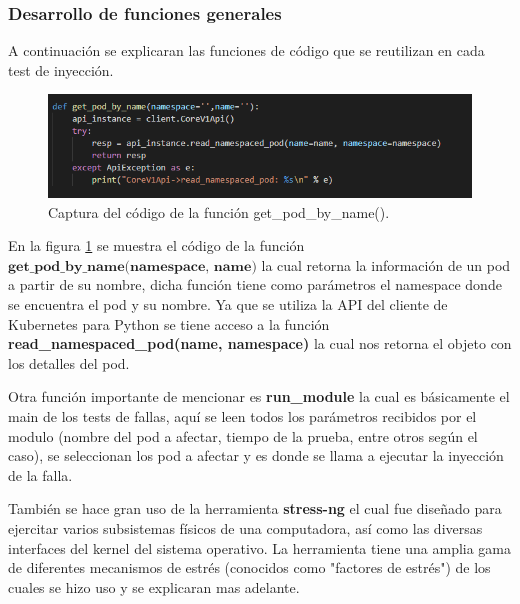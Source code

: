  

\subsubsection{Desarrollo de funciones generales}
\par A continuación se explicaran las funciones de código que se reutilizan en cada test de inyección.

\begin{figure}[htpb!]
	\centering
	\includegraphics[width=0.90\columnwidth]{images/captures/codigo/Capture_get_pod_by_name.PNG}
	\caption{Captura del código de la función get\_pod\_by\_name().}
	\label{fig:codi01}
\end{figure}

\par En la figura \ref{fig:codi01} se muestra el código de la función  $\textbf{get\_pod\_by\_name(namespace, name)}$ la cual retorna la información de un pod a partir de su nombre, dicha función tiene como parámetros el namespace donde se encuentra el pod y su nombre. Ya que se utiliza la API del cliente de Kubernetes para Python se tiene acceso a la función \textbf{read\_namespaced\_pod(name, namespace)} la cual nos retorna el objeto con los detalles del pod. \\

\par Otra función importante de mencionar es \textbf{run\_module} la cual es básicamente el main de los tests de fallas, aquí se leen todos los parámetros recibidos por el modulo (nombre del pod a afectar, tiempo de la prueba, entre otros según el caso), se seleccionan los pod a afectar y es donde se llama a ejecutar la inyección de la falla.\\

\par También se hace gran uso de la herramienta \textbf{stress-ng} el cual fue diseñado para ejercitar varios subsistemas físicos de una computadora, así como las diversas interfaces del kernel del sistema operativo. La herramienta tiene una amplia gama de diferentes mecanismos de estrés (conocidos como "factores de estrés") de los cuales se hizo uso y se explicaran mas adelante.\\

